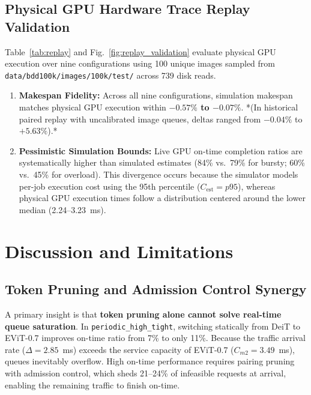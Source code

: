 \documentclass[conference]{IEEEtran}
\begin{document}
\subsection{Physical GPU Hardware Trace Replay Validation}
Table~\ref{tab:replay} and Fig.~\ref{fig:replay_validation} evaluate physical GPU execution over nine configurations using 100 unique images sampled from \texttt{data/bdd100k/images/100k/test/} across 739 disk reads.
\begin{enumerate}
    \item \textbf{Makespan Fidelity:} Across all nine configurations, simulation makespan matches physical GPU execution within \textbf{$-0.57\%$ to $-0.07\%$}. *(In historical paired replay with uncalibrated image queues, deltas ranged from $-0.04\%$ to $+5.63\%$).*
    \item \textbf{Pessimistic Simulation Bounds:} Live GPU on-time completion ratios are systematically higher than simulated estimates (84\% vs.\ 79\% for bursty; 60\% vs.\ 45\% for overload). This divergence occurs because the simulator models per-job execution cost using the 95th percentile ($C_{\text{est}} = p95$), whereas physical GPU execution times follow a distribution centered around the lower median (2.24--3.23~ms).
\end{enumerate}

\section{Discussion and Limitations}

\subsection{Token Pruning and Admission Control Synergy}
A primary insight is that \textbf{token pruning alone cannot solve real-time queue saturation}. In \texttt{periodic\_high\_tight}, switching statically from DeiT to EViT-0.7 improves on-time ratio from 7\% to only 11\%. Because the traffic arrival rate ($\Delta = 2.85$~ms) exceeds the service capacity of EViT-0.7 ($C_{m2} = 3.49$~ms), queues inevitably overflow. High on-time performance requires pairing pruning with admission control, which sheds 21--24\% of infeasible requests at arrival, enabling the remaining traffic to finish on-time.
\end{document}
